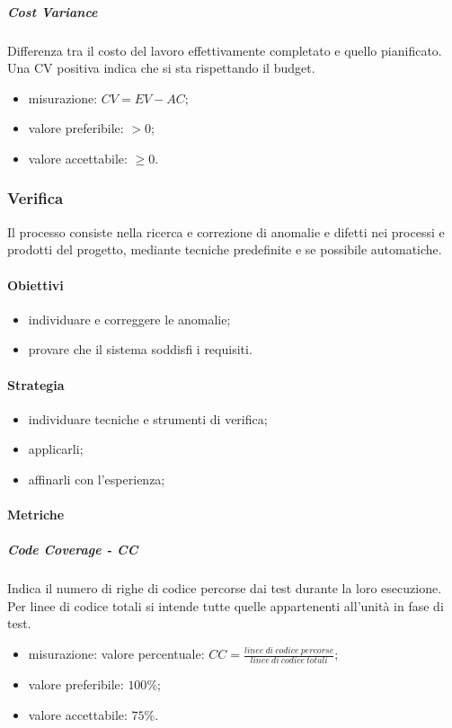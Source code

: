 			\subparagraph{Cost Variance}
			Differenza tra il costo del lavoro effettivamente completato e quello pianificato. Una CV positiva indica che si sta rispettando il budget.
			\begin{itemize}
				\item misurazione: $CV = EV - AC$;
				\item valore preferibile: $ > 0$;
				\item valore accettabile: $ \geq 0$.
			\end{itemize}

	\subsubsection{Verifica}
	Il processo consiste nella ricerca e correzione di anomalie e difetti nei processi e prodotti del progetto, mediante tecniche predefinite e se possibile automatiche.
		\paragraph{Obiettivi}
		\begin{itemize}
			\item individuare e correggere le anomalie;
			\item provare che il sistema soddisfi i requisiti.
		\end{itemize}	
		\paragraph{Strategia}
		\begin{itemize}
			\item individuare tecniche e strumenti di verifica;
			\item applicarli;
			\item affinarli con l'esperienza;
		\end{itemize}	
		\paragraph{Metriche}
			\subparagraph{Code Coverage - CC}
				Indica il numero di righe di codice percorse dai test durante la loro esecuzione. Per linee di codice totali si intende tutte quelle appartenenti all'unità in fase di test.
				\begin{itemize}
					\item misurazione: valore percentuale: $CC = \frac{linee\ di\ codice\ percorse}{linee\ di\ codice\ totali}$;
					\item valore preferibile: $100\%$;
					\item valore accettabile: $75\%$.
				\end{itemize}

